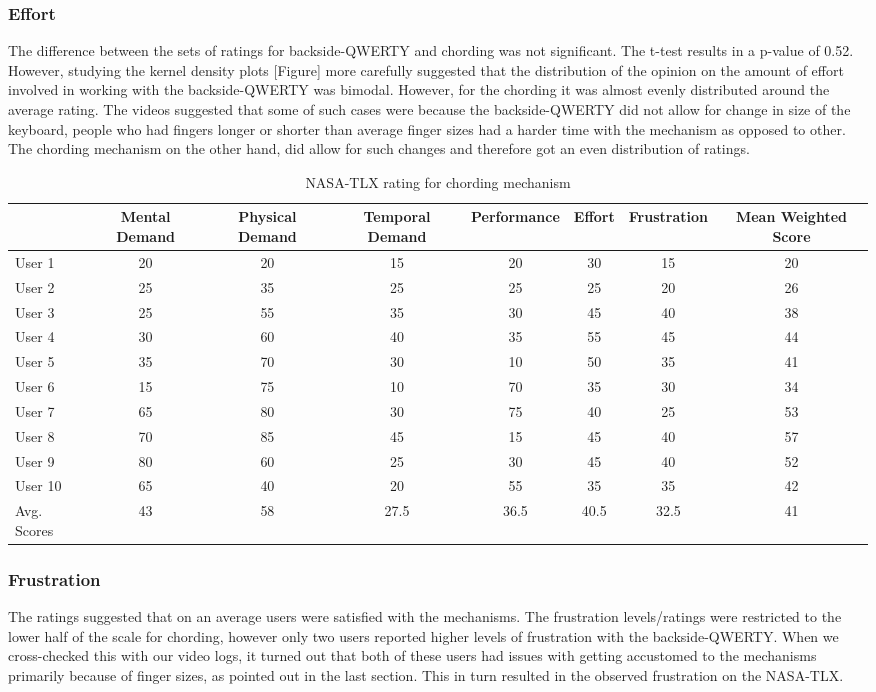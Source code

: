 \subsubsection{Effort}
The difference between the sets of ratings for backside-QWERTY and chording was not significant. The t-test results in a p-value of 0.52. However, studying the kernel density plots [Figure] more carefully suggested that the distribution of the opinion on the amount of effort involved in working with the backside-QWERTY was bimodal. However, for the chording it was almost evenly distributed around the average rating. The videos suggested that some of such cases were because the backside-QWERTY did not allow for change in size of the keyboard, people who had fingers longer or shorter than average finger sizes had a harder time with the mechanism as opposed to other. The chording mechanism on the other hand, did allow for such changes and therefore got an even distribution of ratings.
\begin{table*}
	\centering
		\begin{tabular}{|l|c|c|c|c|c|c|c|} \hline
		                         & Mental Demand & Physical Demand & Temporal Demand & Performance & Effort & Frustration & Mean Weighted Score \\ \hline
			 User 1 & 20 & 20 & 15 & 20 & 30 & 15 & 20\\ \hline
			 User 2 & 25 & 35 & 25 & 25 & 25 & 20 & 26\\ \hline
			 User 3 & 25 & 55 & 35 & 30 & 45 & 40 & 38\\ \hline
			 User 4 & 30 & 60 & 40 & 35 & 55 & 45 & 44\\ \hline
			 User 5 & 35 & 70 & 30 & 10 & 50 & 35 & 41\\ \hline
			 User 6 & 15 & 75 & 10 & 70 & 35 & 30 & 34\\ \hline
			 User 7 & 65 & 80 & 30 & 75 & 40 & 25 & 53\\ \hline
			 User 8 & 70 & 85 & 45 & 15 & 45 & 40 & 57\\ \hline
			 User 9 & 80 & 60 & 25 & 30 & 45 & 40 & 52\\ \hline
			 User 10 & 65 & 40 & 20 & 55 & 35 & 35 & 42\\ \hline  
			 Avg. Scores & 43 & 58 & 27.5 & 36.5 & 40.5 & 32.5 & 41\\ \hline
		\end{tabular}
	\caption{NASA-TLX rating for chording mechanism}
	\label{tab:StatisticsForTextCorpora}
\end{table*}
\subsubsection{Frustration}
The ratings suggested that on an average users were satisfied with the mechanisms. The frustration levels/ratings were restricted to the lower half of the scale for chording, however only two users reported higher levels of frustration with the backside-QWERTY. When we cross-checked this with our video logs, it turned out that both of these users had issues with getting accustomed to the mechanisms primarily because of finger sizes, as pointed out in the last section. This in turn resulted in the observed frustration on the NASA-TLX.   
